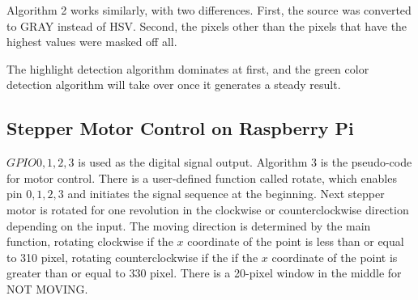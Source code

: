 Algorithm 2 works similarly, with two differences. First, the source was converted to GRAY instead of HSV. Second, the pixels other than the pixels that have the highest values were masked off all. 

The highlight detection algorithm dominates at first, and the green color detection algorithm will take over once it generates a steady result.

\begin{algorithmic} 
\ELSE 
{}
\ENDIF
\ENDFOR
{}
\end{algorithmic}

\begin{algorithmic} 
\ELSE 
{}
\ENDIF
\ENDFOR	
{}
\end{algorithmic}

\subsection{Stepper Motor Control on Raspberry Pi}


$GPIO 0,1,2,3$ is used as the digital signal output. Algorithm 3 is the pseudo-code for motor control. There is a user-defined function called rotate, which enables pin $0,1,2,3$ and initiates the signal sequence at the beginning. Next stepper motor is rotated for one revolution in the clockwise or counterclockwise direction depending on the input. The moving direction is determined by the main function, rotating clockwise if the $x$ coordinate of the point is less than or equal to 310 pixel, rotating counterclockwise if the if the $x$ coordinate of the point is greater than or equal to 330 pixel. There is a 20-pixel window in the middle for NOT MOVING. 

